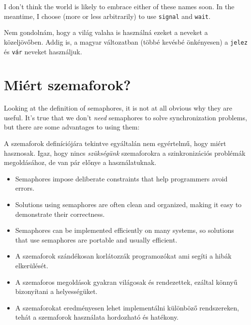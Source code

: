 \documentclass{book}
\begin{document}
I don't think the world is likely to embrace either of these names
soon.  In the meantime, I choose (more or less arbitrarily) to use
{\tt signal} and {\tt wait}.

Nem gondolnám, hogy a világ valaha is használná ezeket a neveket a
közeljövőben. Addig is, a magyar változatban (többé kevésbé önkényesen) a {\tt jelez}
és {\tt vár} neveket használjuk.

\section{Miért szemaforok?}

Looking at the definition of semaphores, it is not at all obvious why
they are useful.  It's true that we don't {\em need} semaphores to
solve synchronization problems, but there are some advantages to using
them:

A szemaforok definíciójára tekintve egyáltalán
nem egyértelmű, hogy miért hasznosak. Igaz, hogy nincs {\em szükségünk}
szemaforokra a szinkronizációs problémák megoldásához, de van pár
előnye a használatuknak.

\begin{itemize}

\item Semaphores impose deliberate constraints that help
programmers avoid errors.

\item Solutions using semaphores are often clean and organized,
making it easy to demonstrate their correctness.

\item Semaphores can be implemented efficiently on many systems,
so solutions that use semaphores are portable and usually
efficient.

\end{itemize}

\begin{itemize}

\item A szemaforok szándékosan korlátozzák programozókat ami segíti a hibák
elkerülését.

\item A szemaforos megoldások gyakran világosak és rendezettek,
ezáltal könnyű bizonyítani a helyességüket.

\item A szemaforokat eredményesen lehet implementálni különböző rendszereken,
tehát a szemaforok használata hordozható és hatékony.

\end{itemize}
\end{document}
